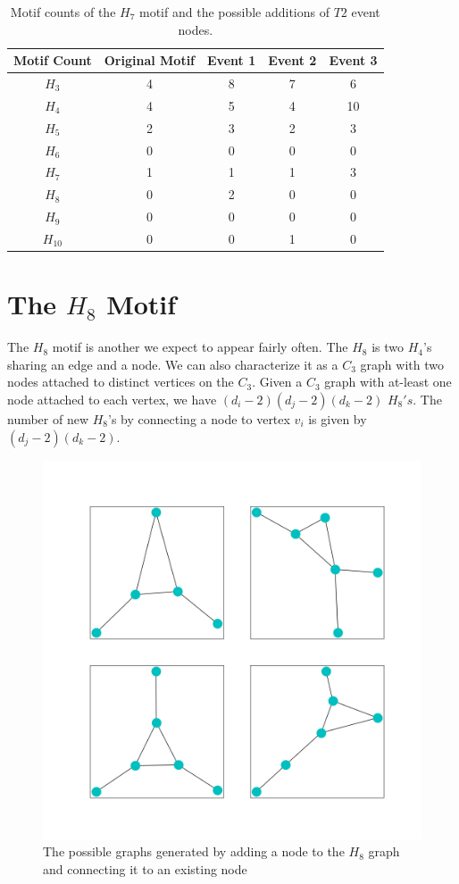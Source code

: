 \begin{table}
    \centering
    \begin{tabular}{||c c c c c||} 
    \hline
    Motif Count & Original Motif & Event 1 & Event 2 & Event 3 \\ [0.5ex] 
    \hline\hline
    $H_{3}$ & 4 & 8 & 7 & 6\\ 
    \hline
    $H_{4}$ & 4 & 5 & 4 & 10\\
    \hline
    $H_{5}$ & 2 & 3 & 2 & 3\\
    \hline
    $H_{6}$ & 0 & 0 & 0 & 0\\
    \hline
    $H_{7}$ & 1 & 1 & 1 & 3\\
    \hline
    $H_{8}$ & 0 & 2 & 0 & 0\\
    \hline
    $H_{9}$ & 0 & 0 & 0 & 0\\
    \hline
    $H_{10}$ & 0 & 0 & 1 & 0\\
    \hline
   \end{tabular}
   \caption{Motif counts of the $H_{7}$ motif and the possible additions of $T2$ event nodes.}
   \label{table:5}
\end{table}

\section{The \texorpdfstring{$H_{8}$}{H8} Motif}
The $H_{8}$ motif is another we expect to appear fairly often. The $H_{8}$
is two $H_{4}$'s sharing an edge and a node. We can also characterize
it as a $C_3$ graph with two nodes attached to distinct vertices on the $C_3$. Given a $C_3$ graph with at-least one node attached
to each vertex, we have $(d_i-2)(d_j-2)(d_k-2)$ $H_{8}'s$. The number of new 
$H_{8}$'s by connecting a node to vertex $v_i$ is given by $(d_j-2)(d_k-2)$.

\begin{figure}[!ht]
    \includegraphics[width=12cm]{Images/H8_evolution.png}
    \centering
    \caption{The possible graphs generated by adding a node to the $H_{8}$ graph 
    and connecting it to an existing node}
\end{figure}

